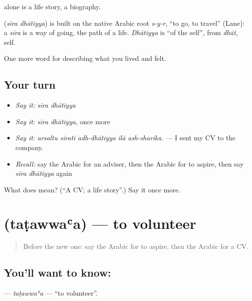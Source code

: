  alone is a life story, a biography.

\begin{cousinweb}
\textbf{ } (\emph{sīra dhātiyya}) is built on the native Arabic root \emph{s-y-r}, \textquotedblleft{}to go, to travel\textquotedblright{} (Lane): a \emph{sīra} is a way of going, the path of a life. \emph{Dhātiyya} is \textquotedblleft{}of the self\textquotedblright{}, from \emph{dhāt}, self.
\end{cousinweb}

\begin{grammarlens}[title={What you've built}]
One more word for describing what you lived and felt.
\end{grammarlens}

\subsection*{Your turn}
\begin{itemize}
\raggedright
  \item \emph{Say it:} \emph{sīra dhātiyya}
  \item \emph{Say it:} \emph{sīra dhātiyya}, once more
  \item \emph{Say it:} \emph{arsaltu sīratī adh-dhātiyya ilā ash-sharika.} — I sent my CV to the company.
  \item \emph{Recall:} say the Arabic for an adviser, then the Arabic for to aspire, then say \emph{sīra dhātiyya} again
\end{itemize}

\begin{tcolorbox}[breakable,colback=teal!4,colframe=teal!35!black,title={Before you move on}]
What does   mean? (\textquotedblleft{}A CV; a life story\textquotedblright{}.) Say it once more.
\end{tcolorbox}
\section[\texorpdfstring{\ar{تطوع} (taṭawwaʿa)}{تطوع (taṭawwaʿa)}]{ (taṭawwaʿa) — to volunteer}

\label{lesson:AR-C519-tatawwaa}



\begin{quote}
Before the new one: say the Arabic for to aspire, then the Arabic for a CV.
\end{quote}

\subsection*{You'll want to know: }
\textbf{} — \emph{taṭawwaʿa} — \textquotedblleft{}to volunteer\textquotedblright{}.

